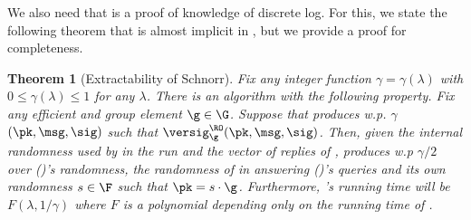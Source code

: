 \documentclass[11pt]{article}
\numberwithin{equation}{section} %
\numberwithin{figure}{section} %
\newtheorem{thm}{Theorem}[section]
\begin{document}
We also need that \schnorr is a proof of knowledge of discrete log. For this,
we state the following theorem that is almost implicit in \cite{schnorrSecurity}, but we provide a proof for completeness.
\begin{thm}[Extractability of Schnorr]\label{thm:extractSchnorr}
Fix any integer function $\gamma=\gamma(\lambda)$ with $0\leq \gamma(\lambda)\leq 1$ for any $\lambda$.
There is an algorithm \ext with the following property.
Fix any efficient \adv and group element $\g\in\G$. Suppose that \adv produces w.p. $\gamma$
$(\pk,\msg,\sig)$ such that $\versig^{\RO}_{\g}(\pk,\msg,\sig)$.
Then, given the internal randomness used by \adv in the run and the vector \rand of replies of \RO,
\ext produces w.p $\gamma/2$ over (\adv)'s randomness, the randomness of \RO in answering (\adv)'s queries and its own randomness $s\in\F$ such that
$\pk = s\cdot \g$.
Furthermore, \ext's running time will be $F(\lambda,1/\gamma)$ where $F$ is a polynomial depending only on the running time of \adv.
\end{thm}
\end{document}
